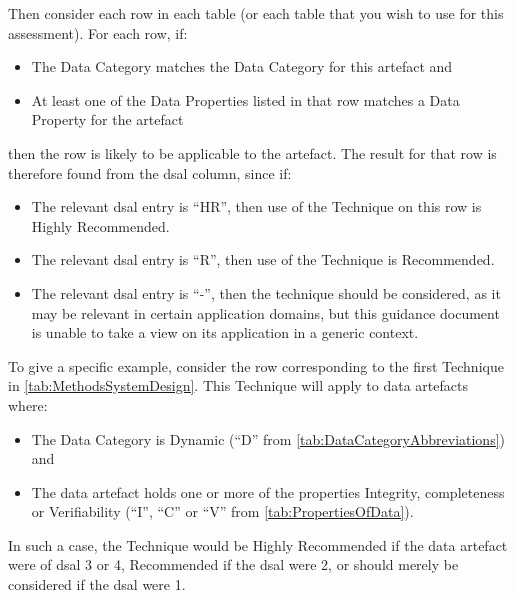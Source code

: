 Then consider each row in each table (or each table that you wish to use for this assessment). For each row, if:
\begin{itemize}
    \item The Data Category matches the Data Category for this artefact and
    \item At least one of the Data Properties listed in that row matches a Data Property for the artefact 
\end{itemize}
then the row is likely to be applicable to the artefact. The result for that row is therefore found from the \gls{dsal} column, since if:
\begin{itemize}
    \item The relevant \gls{dsal} entry is ``HR'', then use of the Technique on this row is Highly Recommended.
    \item The relevant \gls{dsal} entry is ``R'', then use of the Technique is Recommended.
    \item The relevant \gls{dsal} entry is ``-'', then the technique should be considered, as it may be relevant in certain application domains, but this guidance document is unable to take a view on its application in a generic context.
\end{itemize}

To give a specific example, consider the row corresponding to the first Technique in \autoref{tab:MethodsSystemDesign}. This Technique will apply to data artefacts where:
\begin{itemize}
    \item The Data Category is Dynamic (``D'' from \autoref{tab:DataCategoryAbbreviations}) and
    \item The data artefact holds one or more of the properties Integrity, \gls{completeness} or Verifiability (``I'', ``C'' or ``V'' from \autoref{tab:PropertiesOfData}).
\end{itemize}
In such a case, the Technique would be Highly Recommended if the data artefact were of \gls{dsal} 3 or 4, Recommended if the \gls{dsal} were 2, or should merely be considered if the \gls{dsal} were 1.

